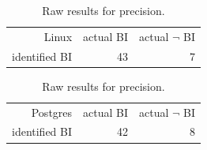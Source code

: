
\begin{table}
\begin{center}
\begin{tabular}{rrr}
Linux & actual BI & actual $\neg$ BI \\
identified BI & 43 & 7 \\
\end{tabular} 

\begin{tabular}{rrr} Postgres & actual BI & actual $\neg$ BI \\
identified BI & 42 & 8 \\
\end{tabular}
\end{center}
\caption{\label{tab:pr-raw}Raw results for precision.}


\end{table}



